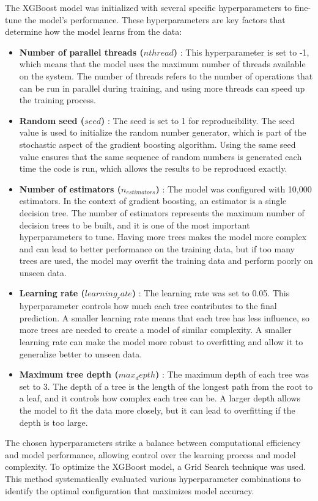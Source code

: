 The XGBoost model was initialized with several specific hyperparameters to fine-tune the model's performance. These hyperparameters are key factors that determine how the model learns from the data:

\begin{itemize}
	\item  \textbf{Number of parallel threads ($nthread$)} : This hyperparameter is set to -1, which means that the model uses the maximum number of threads available on the system. The number of threads refers to the number of operations that can be run in parallel during training, and using more threads can speed up the training process.
	\item  \textbf{Random seed ($seed$)} : The seed is set to 1 for reproducibility. The seed value is used to initialize the random number generator, which is part of the stochastic aspect of the gradient boosting algorithm. Using the same seed value ensures that the same sequence of random numbers is generated each time the code is run, which allows the results to be reproduced exactly.
	\item  \textbf{Number of estimators ($n_{estimators}$)} : The model was configured with 10,000 estimators. In the context of gradient boosting, an estimator is a single decision tree. The number of estimators represents the maximum number of decision trees to be built, and it is one of the most important hyperparameters to tune. Having more trees makes the model more complex and can lead to better performance on the training data, but if too many trees are used, the model may overfit the training data and perform poorly on unseen data.
	\item  \textbf{Learning rate ($learning_rate$)} : The learning rate was set to 0.05. This hyperparameter controls how much each tree contributes to the final prediction. A smaller learning rate means that each tree has less influence, so more trees are needed to create a model of similar complexity. A smaller learning rate can make the model more robust to overfitting and allow it to generalize better to unseen data.
	\item  \textbf{Maximum tree depth ($max_depth$)} : The maximum depth of each tree was set to 3. The depth of a tree is the length of the longest path from the root to a leaf, and it controls how complex each tree can be. A larger depth allows the model to fit the data more closely, but it can lead to overfitting if the depth is too large. 
\end{itemize}
The chosen hyperparameters strike a balance between computational efficiency and model performance, allowing control over the learning process and model complexity. To optimize the XGBoost model, a Grid Search technique was used. This method systematically evaluated various hyperparameter combinations to identify the optimal configuration that maximizes model accuracy.



